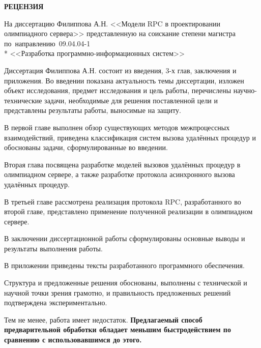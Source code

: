 
\renewcommand{\baselinestretch}{1.3} \setlength{\lineskiplimit}{-10cm}



\begin{titlepage}

\thispagestyle{empty}

\begin{center}
    \large \textbf{\uppercase{Рецензия}}

    \vspace{1em}

    На диссертацию Филиппова А.Н. <<Модели RPC в проектировании олимпиадного
    сервера>> представленную на соискание степени магистра
    по~направлению~09.04.04-1 \\*
    <<Разработка программно-информационных систем>>
\end{center}

\vspace{2em}

Диссертация Филиппова А.Н. состоит из введения, 3-х глав, заключения
и приложения. Во введении показана актуальность темы диссертации, изложен объект
исследования, предмет исследования и цель работы, перечислены научно-технические
задачи, необходимые для решения поставленной цели и представлены результаты
работы, выносимые на защиту.

В первой главе выполнен обзор существующих методов межпроцессных взаимодействий,
приведена классификация систем вызова удалённых процедур и обоснованы задачи,
сформулированные во введении.

Вторая глава посвящена разработке моделей вызовов удалённых процедур
в олимпиадном сервере, а также разработке протокола асинхронного вызова
удалённых процедур.

В третьей главе рассмотрена реализация протокола RPC, разработанного во второй
главе, представлено применение полученной реализации в олимпиадном сервере.

В заключении диссертационной работы сформулированы основные выводы и результаты
выполнения работы.

В приложении приведены тексты разработанного программного обеспечения.

Структура и предложенные решения обоснованы, выполнены с технической
и научной точки зрения грамотно, и правильность предложенных решений
подтверждена экспериментально.

%
Тем не менее, работа имеет недостаток. \textbf{Предлагаемый способ предварительной обработки обладает меньшим быстродействием по сравнению с использовавшимся до этого.}
%


\end{titlepage}
